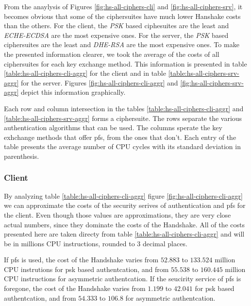 \documentclass{llncs}
\begin{document}
From the anaylysis of Figures \ref{fig:hs-all-ciphers-cli} and \ref{fig:hs-all-ciphers-srv}, it becomes obvious 
that some of the ciphersuites have  much lower Hanshake costs than the others. For the client, the \textit{PSK} based 
ciphesuites are the least and \textit{ECHE-ECDSA} are the most expensive ones. For the server, the \textit{PSK} based
ciphersuites are the least and \textit{DHE-RSA} are the most expensive ones. To make the presented information clearer, 
we took the average of the costs of all ciphersuites for each key exchange method. This information is presented in
table \ref{table:hs-all-ciphers-cli-aggr} for the client and in table \ref{table:hs-all-ciphers-srv-aggr} for the server.
Figures \ref{fig:hs-all-ciphers-cli-aggr} and \ref{fig:hs-all-ciphers-srv-aggr} depict this information graphically.
 
Each row and column intersection in the tables \ref{table:hs-all-ciphers-cli-aggr} and \ref{table:hs-all-ciphers-srv-aggr} 
forms a ciphersuite. The rows separate the various authentication algorithms that can be used. The columns sperate the 
key exhchange methods that offer \gls{pfs}, from the ones that don't. Each entry of the table presents the average 
number of CPU cycles with its standard deviation in parenthesis.

\subsubsection{Client}

By analyzing table \ref{table:hs-all-ciphers-cli-aggr} figure \ref{fig:hs-all-ciphers-cli-aggr} we can approximate
the costs of the security serives of authentication and \gls{pfs} for the client. Even though those values are approximations, 
they are very close actual numbers, since they dominate the costs of the Handshake. All of the costs presented here
are taken directy from table \ref{table:hs-all-ciphers-cli-aggr} and will be in millions CPU instructions, 
rounded to $3$ decimal places.

If \gls{pfs} is used, the cost of the Handshake varies from $52.883$ to $133.524$ 
million CPU instrutions for \gls{psk} based authentcation, and from $55.538$ to $160.445$ million CPU instructions for 
asymmetric authentcation. If the seucirity service of \gls{pfs} is foregone, the cost
of the Handshake varies from $1.199$ to $42.041$ for \gls{psk} based authentcation,
and from $54.333$ to $106.8$ for asymmetric authentcation.
\end{document}
